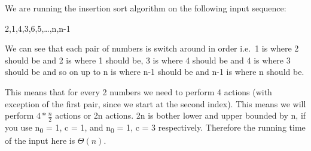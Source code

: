 \documentclass[]{article}
\begin{document}
We are running the insertion sort algorithm on the following input
sequence:

2,1,4,3,6,5,\ldots{},n,n-1

We can see that each pair of numbers is switch around in order i.e.~1 is
where 2 should be and 2 is where 1 should be, 3 is where 4 should be and
4 is where 3 should be and so on up to n is where n-1 should be and n-1
is where n should be.

This means that for every 2 numbers we need to perform 4 actions (with
exception of the first pair, since we start at the second index). This
means we will perform \(4 * \frac{n}2\) actions or 2n actions. 2n is
bother lower and upper bounded by n, if you use n\textsubscript{0} = 1,
c = 1, and n\textsubscript{0} = 1, c = 3 respectively. Therefore the
running time of the input here is \(\Theta(n)\).
\end{document}

